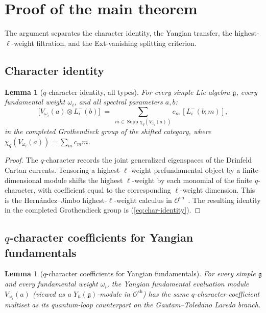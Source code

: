 \documentclass[11pt,reqno]{amsart}
\newtheorem{lemma}[theorem]{Lemma}
\theoremstyle{definition}
\theoremstyle{remark}
\newcommand{\cO}{\mathcal{O}}
\newcommand{\fg}{\mathfrak{g}}
\newcommand{\Yh}{Y_\hbar(\fg)}
\numberwithin{equation}{section}
\begin{document}
\section{Proof of the main theorem}\label{sec:proof}

The argument separates the character identity, the Yangian transfer,
the highest-$\ell$-weight filtration, and the Ext-vanishing
splitting criterion.

\subsection{Character identity}

\begin{lemma}[$q$-character identity, all types]
\label{lem:character-identity}
For every simple Lie algebra $\fg$, every fundamental weight
$\omega_i$, and all spectral parameters $a, b$:
\begin{equation}\label{eq:char-identity}
\bigl[V_{\omega_i}(a) \otimes L^-_i(b)\bigr]
 \;=\;
 \sum_{m\in \operatorname{Supp}\chi_q(V_{\omega_i}(a))}
 c_m\,[L^-_i(b;m)],
\end{equation}
in the completed Grothendieck group of the shifted category, where
$\chi_q(V_{\omega_i}(a))=\sum_m c_m m$.
\end{lemma}

\begin{proof}
The $q$-character records the joint generalized eigenspaces of the
Drinfeld Cartan currents. Tensoring a highest-$\ell$-weight
prefundamental object by a finite-dimensional module shifts the
highest $\ell$-weight by each monomial of the finite
$q$-character, with coefficient equal to the corresponding
$\ell$-weight dimension. This is the Hern\'andez--Jimbo
highest-$\ell$-weight calculus in
$\cO^{\mathrm{sh}}$~\cite{HernandezJimbo12}. The resulting
identity in the completed Grothendieck group is
(\ref{eq:char-identity}).
\end{proof}

\subsection{$q$-character coefficients for Yangian fundamentals}

\begin{lemma}[$q$-character coefficients for Yangian fundamentals]
\label{lem:qcharacter-yangian}
For every simple $\fg$ and every fundamental weight $\omega_i$,
the Yangian fundamental evaluation module $V_{\omega_i}(a)$
(viewed as a $\Yh$-module in $\cO^{\mathrm{sh}}$) has the same
$q$-character coefficient multiset as its quantum-loop counterpart
on the Gautam--Toledano Laredo branch.
\end{lemma}
\end{document}
